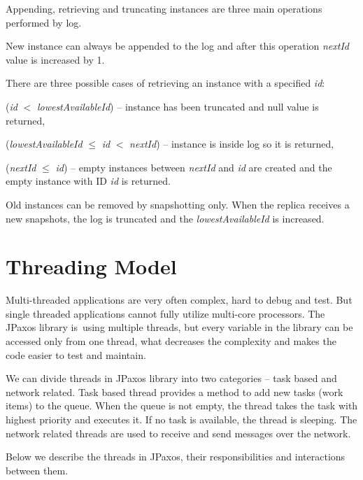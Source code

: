 Appending, retrieving and truncating instances are three main operations per\-for\-med by log.

New instance can always be appended to the log and after this operation \textit{nextId} value is increased by 1.

\noindent There are three possible cases of retrieving an instance with a specified \textit{id}:
\begin{tightList}
  \item[\textbullet] (\textit{id} $<$ \textit{lowestAvailableId}) -- instance has been truncated and null value is returned,
  \item[\textbullet] (\textit{lowestAvailableId} $\leq$ \textit{id} $<$ \textit{nextId}) -- instance is inside log so it is returned,
  \item[\textbullet] (\textit{nextId} $\leq$ \textit{id}) -- empty instances between \textit{nextId} and \textit{id} are created and the empty instance with ID \textit{id} is returned.
\end{tightList}

\noindent Old instances can be removed by snapshotting only. When the replica receives a new snapshots, the log is truncated and the \textit{lowestAvailableId} is increased.

\section{Threading Model}
\label{sec:threads}

Multi-threaded applications are very often complex, hard to debug and test. But single threaded applications cannot fully utilize multi-core processors. The JPaxos library is~using multiple threads, but every variable in the library can be accessed only from one thread, what decreases the complexity and makes the code easier to test and maintain.

We can divide threads in JPaxos library into two categories -- task based and
network related.
Task based thread provides a method to add new tasks (work
items) to the queue. When the queue is not empty, the thread takes the task
with highest priority and executes it. If no task is available, the thread is
sleeping. The network related threads are used to receive and send messages
over the network.

Below we describe the threads in JPaxos, their responsibilities and interactions between them. 

